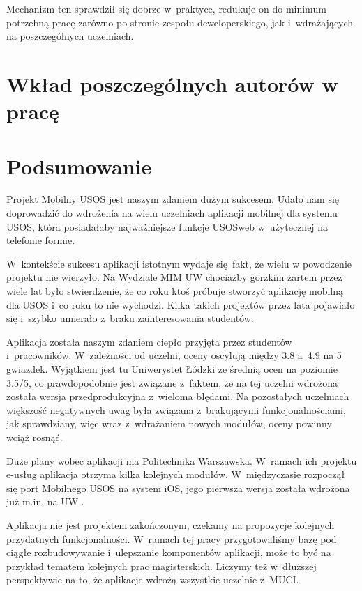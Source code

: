 \documentclass{pracamgr}
\begin{document}
Mechanizm ten sprawdził się dobrze w~praktyce, redukuje on do minimum potrzebną pracę
zarówno po stronie zespołu deweloperskiego, jak i~wdrażających na poszczególnych uczelniach.

\chapter{Wkład poszczególnych autorów w pracę}


\chapter{Podsumowanie}

Projekt Mobilny USOS jest naszym zdaniem dużym sukcesem. Udało nam się doprowadzić do
wdrożenia na wielu uczelniach aplikacji mobilnej dla systemu USOS, która posiadałaby
najważniejsze funkcje USOSweb w~użytecznej na telefonie formie.

W~kontekście sukcesu aplikacji istotnym wydaje się fakt, że wielu w powodzenie 
projektu nie wierzyło. Na Wydziale MIM UW chociażby gorzkim żartem przez wiele
lat było stwierdzenie, że co roku ktoś próbuje stworzyć aplikację mobilną dla USOS
i~co roku to nie wychodzi. Kilka takich projektów przez lata pojawiało się i~szybko
umierało z~braku zainteresowania studentów. 

Aplikacja została naszym zdaniem ciepło przyjęta przez studentów i~pracowników.
W~zależności od uczelni, oceny oscylują między 3.8 a~4.9 na 5 gwiazdek.
Wyjątkiem jest tu Uniwerystet Łódzki ze średnią ocen na poziomie 3.5/5, co prawdopodobnie
jest związane z~faktem, że na tej uczelni wdrożona została wersja przedprodukcyjna z~wieloma
błędami. Na pozostałych uczelniach większość negatywnych uwag była związana z~brakującymi
funkcjonalnościami, jak sprawdziany, więc wraz z~wdrażaniem nowych modułów, oceny powinny
wciąż rosnąć.

Duże plany wobec aplikacji ma Politechnika Warszawska. W~ramach ich projektu e-usług
aplikacja otrzyma kilka kolejnych modułów. W~międzyczasie
rozpoczął się port Mobilnego USOS na system iOS, jego pierwsza wersja została wdrożona
już m.in. na UW \cite{uw-ios, appstore}.

Aplikacja nie jest projektem zakończonym, czekamy na propozycje kolejnych przydatnych
funkcjonalności. W~ramach tej
pracy przygotowaliśmy bazę pod ciągłe rozbudowywanie i~ulepszanie komponentów aplikacji,
może to być na przykład tematem kolejnych prac magisterskich. Liczymy też w~dłuższej
perspektywie na to, że aplikacje wdrożą wszystkie uczelnie z~MUCI.
\end{document}

